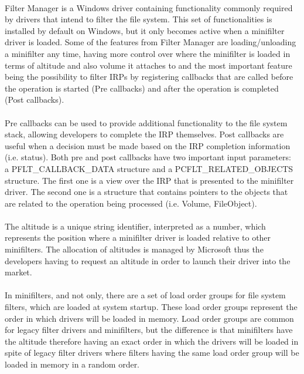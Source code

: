 		\paragraph{}
		Filter Manager is a Windows driver containing functionality commonly required by drivers that intend to filter the file system. This set of functionalities is installed by default on Windows, but it only becomes active when a minifilter driver is loaded\cite{MSDNFltMgrConcepts}. Some of the features from Filter Manager are loading/unloading a minifilter any time, having more control over where the minifilter is loaded in terms of altitude and also volume it attaches to and the most important feature being the possibility to filter IRPs by registering callbacks that are called before the operation is started (Pre callbacks) and after the operation is completed (Post callbacks). 
		
		\paragraph{}	
		Pre callbacks can be used to provide additional functionality to the file system stack, allowing developers to complete the IRP themselves. Post callbacks are useful when a decision must be made based on the IRP completion information (i.e. status). Both pre and post callbacks have two important input parameters: \\ a PFLT\_CALLBACK\_DATA structure and a PCFLT\_RELATED\_OBJECTS structure. The first one is a view over the IRP that is presented to the minifilter driver. The second one is a structure that contains pointers to the objects that are related to the operation being processed (i.e. Volume, FileObject).
		
		\paragraph{}
		The altitude is a unique string identifier, interpreted as a number, which represents the position where a minifilter driver is loaded relative to other minifilters. The allocation of altitudes is managed by Microsoft thus the developers having to request an altitude in order to launch their driver into the market\cite{MSDNFltMgrConcepts}.
		
		\paragraph{}
		In minifilters, and not only, there are a set of load order groups for file system filters, which are loaded at system startup. These load order groups represent the order in which drivers will be loaded in memory\cite{MSDNFltMgrConcepts}. Load order groups are common for legacy filter drivers and minifilters, but the difference is that minifilters have the altitude therefore having an exact order in which the drivers will be loaded in spite of legacy filter drivers where filters having the same load order group will be loaded in memory in a random order.
		
